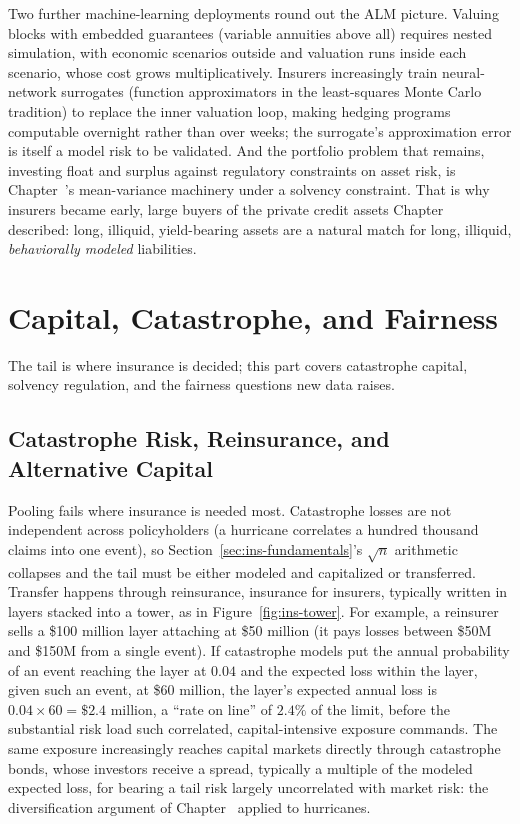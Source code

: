 \documentclass[../ai_in_finance]{subfiles}
\begin{document}
Two further machine-learning deployments round out the ALM picture. Valuing blocks with embedded guarantees (variable annuities above all) requires nested simulation, with economic scenarios outside and valuation runs inside each scenario, whose cost grows multiplicatively. Insurers increasingly train neural-network surrogates (function approximators in the least-squares Monte Carlo tradition) to replace the inner valuation loop, making hedging programs computable overnight rather than over weeks; the surrogate's approximation error is itself a model risk to be validated. And the portfolio problem that remains, investing float and surplus against regulatory constraints on asset risk, is Chapter~'s mean-variance machinery under a solvency constraint. That is why insurers became early, large buyers of the private credit assets Chapter~ described: long, illiquid, yield-bearing assets are a natural match for long, illiquid, \emph{behaviorally modeled} liabilities.

\section{Capital, Catastrophe, and Fairness}

The tail is where insurance is decided; this part covers catastrophe capital, solvency regulation, and the fairness questions new data raises.

\subsection{Catastrophe Risk, Reinsurance, and Alternative Capital}
\label{sec:ins-cat}

Pooling fails where insurance is needed most. Catastrophe losses are not independent across policyholders (a hurricane correlates a hundred thousand claims into one event), so Section~\ref{sec:ins-fundamentals}'s $\sqrt{n}$ arithmetic collapses and the tail must be either modeled and capitalized or transferred. Transfer happens through reinsurance, insurance for insurers, typically written in layers stacked into a tower, as in Figure~\ref{fig:ins-tower}. For example, a reinsurer sells a \$100 million layer attaching at \$50 million (it pays losses between \$50M and \$150M from a single event). If catastrophe models put the annual probability of an event reaching the layer at $0.04$ and the expected loss within the layer, given such an event, at \$60 million, the layer's expected annual loss is $0.04 \times 60 = \$2.4$ million, a ``rate on line'' of $2.4\%$ of the limit, before the substantial risk load such correlated, capital-intensive exposure commands. The same exposure increasingly reaches capital markets directly through catastrophe bonds, whose investors receive a spread, typically a multiple of the modeled expected loss, for bearing a tail risk largely uncorrelated with market risk: the diversification argument of Chapter~ applied to hurricanes.
\end{document}

